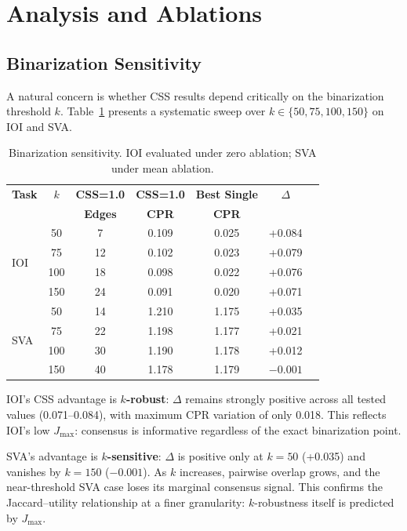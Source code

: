 \documentclass[11pt]{article}
\newcommand{\css}{\textsc{CSS}}
\begin{document}
\section{Analysis and Ablations}
\label{sec:analysis}

\subsection{Binarization Sensitivity}
\label{sec:sensitivity}

A natural concern is whether \css{} results depend critically on the binarization threshold $k$. Table~\ref{tab:sensitivity} presents a systematic sweep over $k \in \{50, 75, 100, 150\}$ on IOI and SVA.

\begin{table}[t]
\centering
\caption{Binarization sensitivity. IOI evaluated under zero ablation; SVA under mean ablation.}
\label{tab:sensitivity}
\small
\begin{tabular}{lcccccc}
\toprule
\textbf{Task} & \textbf{$k$} & \textbf{CSS=1.0} & \textbf{CSS=1.0} & \textbf{Best Single} & \textbf{$\Delta$} \\
 & & \textbf{Edges} & \textbf{CPR} & \textbf{CPR} & \\
\midrule
\multirow{4}{*}{IOI} & 50 & 7 & 0.109 & 0.025 & +0.084 \\
 & 75 & 12 & 0.102 & 0.023 & +0.079 \\
 & 100 & 18 & 0.098 & 0.022 & +0.076 \\
 & 150 & 24 & 0.091 & 0.020 & +0.071 \\
\midrule
\multirow{4}{*}{SVA} & 50 & 14 & 1.210 & 1.175 & +0.035 \\
 & 75 & 22 & 1.198 & 1.177 & +0.021 \\
 & 100 & 30 & 1.190 & 1.178 & +0.012 \\
 & 150 & 40 & 1.178 & 1.179 & $-0.001$ \\
\bottomrule
\end{tabular}
\end{table}

IOI's \css{} advantage is \textbf{$k$-robust}: $\Delta$ remains strongly positive across all tested values (0.071--0.084), with maximum CPR variation of only 0.018. This reflects IOI's low $J_{\max}$: consensus is informative regardless of the exact binarization point.

SVA's advantage is \textbf{$k$-sensitive}: $\Delta$ is positive only at $k=50$ (+0.035) and vanishes by $k=150$ ($-0.001$). As $k$ increases, pairwise overlap grows, and the near-threshold SVA case loses its marginal consensus signal. This confirms the Jaccard--utility relationship at a finer granularity: $k$-robustness itself is predicted by $J_{\max}$.
\end{document}
